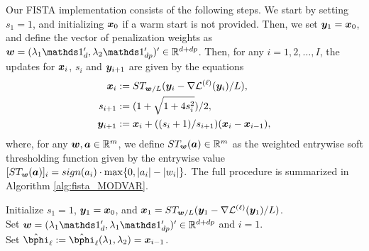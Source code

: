 Our FISTA implementation consists of the following steps. We start by setting $s_1 = 1$, and initializing $\bm{x}_0$ if a warm start is not provided. Then, we set $\bm{y}_1 = \bm{x}_0$, and define the vector of penalization weights as $\bw = (\lambda_1 \indv{d}', \lambda_2 \indv{dp}')' \in \bbR^{d+dp}$. Then, for any $i=1,2,\ldots, I$, the updates for $\bm{x}_i$, $s_i$ and $\bm{y}_{i+1}$ are given by the equations
\begin{align*}
	\bm{x}_{i} &:= ST_{\bm{w}/L}( \bm{y}_i - \nabla \mathcal{L}^{(\ell)}(\bm{y}_i) / L),\\
	s_{i + 1} &:= (1+\sqrt{1 + 4 s_{i}^{2}})/2,\\
	\bm{y}_{i + 1} &:= \bm{x}_i + ((s_i + 1)/s_{i+1}) (\bm{x}_i - \bm{x}_{i - 1}),
\end{align*}
where, for any $\bm{w},\bm{a}\in\mathbb{R}^{m}$, we define $ST_{\bm{w}}(\bm{a})\in\mathbb{R}^{m}$ as the weighted entrywise soft thresholding function given by the entrywise value $[ST_{\bm{w}}(\bm{a})]_i = sign(a_i) \cdot \max\{ 0, |a_i| - |w_i| \}.$ The full procedure is summarized in Algorithm \ref{alg:fista_MODVAR}. 




\begin{singlespace}
	\begin{algorithm}
		\SetAlgoLined
		Initialize $s_1 = 1$, $\bm{y}_1= \bm{x}_0 $, and $\bm{x}_1 =  ST_{\bm{w}/L}( \bm{y}_1 - \nabla \mathcal{L}^{(\ell)}(\bm{y}_1) / L)$.\\
		Set $\bw = (\lambda_1 \indv{d}', \lambda_1 \indv{dp}')' \in \bbR^{d+dp}$ and $i = 1$.\\
		Set $\hat\bphi_\ell := \hat\bphi_\ell(\lambda_1,\lambda_2) = \bx_{i-1}$.\\
		\caption{FISTA for $\ell$-step of MOD-VAR estimation.}\label{alg:fista_MODVAR}
	\end{algorithm}
\end{singlespace}%


